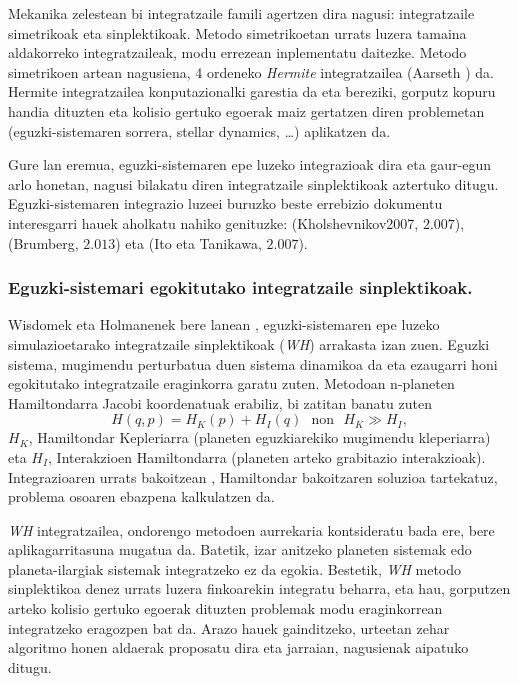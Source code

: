 Mekanika zelestean bi integratzaile famili agertzen dira nagusi: integratzaile simetrikoak eta sinplektikoak. Metodo simetrikoetan urrats luzera tamaina aldakorreko integratzaileak, modu errezean inplementatu daitezke. Metodo simetrikoen artean nagusiena, 4 ordeneko \emph{Hermite} integratzailea (Aarseth \cite{Aarseth2008}) da. Hermite integratzailea konputazionalki garestia da eta bereziki, gorputz kopuru handia dituzten eta kolisio gertuko egoerak maiz gertatzen diren problemetan (eguzki-sistemaren sorrera, stellar dynamics, \dots) aplikatzen da.    
 
Gure lan eremua, eguzki-sistemaren epe luzeko integrazioak dira eta gaur-egun arlo honetan, nagusi bilakatu diren integratzaile sinplektikoak aztertuko  ditugu. Eguzki-sistemaren integrazio luzeei buruzko beste errebizio dokumentu interesgarri hauek aholkatu nahiko genituzke: \cite{Kholshevnikov2007} (Kholshevnikov2007, $2.007$), \cite{Brumberg2013} (Brumberg, $2.013$) eta  \cite{Ito2007} (Ito eta Tanikawa, $2.007$).

\subsubsection*{Eguzki-sistemari egokitutako integratzaile sinplektikoak.}

Wisdomek eta Holmanenek bere lanean , eguzki-sistemaren epe luzeko simulazioetarako integratzaile  sinplektikoak (\emph{WH}) arrakasta izan zuen. Eguzki sistema, mugimendu perturbatua duen sistema dinamikoa da eta ezaugarri honi egokitutako integratzaile eraginkorra garatu zuten. Metodoan n-planeten Hamiltondarra Jacobi koordenatuak  erabiliz, bi zatitan banatu zuten
\begin{equation*}
H(q,p)=H_K(p)+H_I(q) \ \ \ \mbox{non} \ \ \ H_K\gg H_I,
\end{equation*}
$H_K$, Hamiltondar Kepleriarra (planeten eguzkiarekiko mugimendu kleperiarra) eta $H_I$, Interakzioen Hamiltondarra (planeten arteko grabitazio interakzioak). Integrazioaren urrats bakoitzean , Hamiltondar bakoitzaren soluzioa tartekatuz, problema osoaren ebazpena kalkulatzen da.  

\emph{WH} integratzailea, ondorengo metodoen aurrekaria kontsideratu bada ere, bere aplikagarritasuna mugatua da. Batetik, izar anitzeko planeten sistemak edo planeta-ilargiak sistemak integratzeko ez da egokia. Bestetik, \emph{WH} metodo  sinplektikoa denez urrats luzera finkoarekin integratu beharra, eta hau, gorputzen arteko kolisio gertuko egoerak dituzten problemak modu eraginkorrean integratzeko eragozpen bat da. Arazo hauek gainditzeko, urteetan zehar algoritmo honen aldaerak proposatu dira eta jarraian, nagusienak aipatuko ditugu. 

